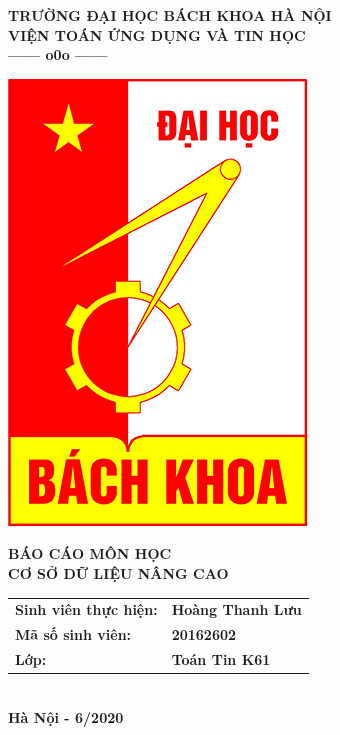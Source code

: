 \documentclass[12pt,a4paper]{report}
\begin{document}
	\thisfancypage{%
		\setlength{\fboxsep}{0pt}%
		\fbox}{} %
	\thispagestyle{empty}
	\begin{center}
		\vspace*{0.5cm}
		\fontsize{14}{12}
		\textbf{TRƯỜNG ĐẠI HỌC BÁCH KHOA HÀ NỘI}\\
		\textbf{VIỆN TOÁN ỨNG DỤNG VÀ TIN HỌC}\\
		\textbf{------ o0o ------}
	\end{center}
	\vspace*{1.1cm}
	\begin{center}
		\includegraphics[scale=.5]{bk.png}
	\end{center}
	\vspace*{1.1cm}
	\begin{center}
		\fontsize{20}{18}
		\textbf{BÁO CÁO MÔN HỌC\\ CƠ SỞ DỮ LIỆU NÂNG CAO}\\
		\vspace*{0.8cm}
		\fontsize{18}{16}
	\end{center}
	\vspace*{0.7cm}
	\begin{center}
		\fontsize{14}{16}
		\begin{tabular}{ll}
			 
			\textbf{Sinh viên thực hiện:} & \textbf{Hoàng Thanh Lưu} \\ 
			\textbf{Mã số sinh viên:} & \textbf{20162602}\\
			\textbf{Lớp:}  & \textbf{Toán Tin K61} \\ 
		\end{tabular} \\
		\vspace*{2.5cm}
		\fontsize{14}{16}
		\textbf{Hà Nội - 6/2020}
	\end{center}
\end{document}

